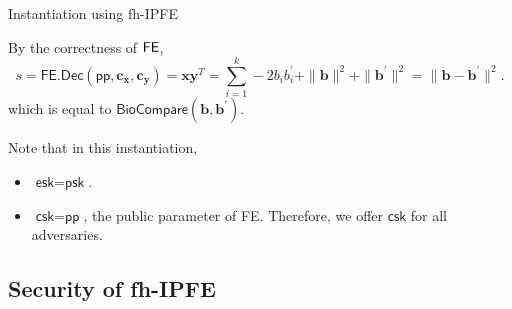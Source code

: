 \begin{frame}{Instantiation using fh-IPFE \cite{cryptoeprint:2023/481}}

By the correctness of $\sf FE$,
\[
	s = \textsf{FE.Dec}(\textsf{pp}, \mathbf{c_x}, \mathbf{c_y}) =  \mathbf{x} \mathbf{y}^T = \sum_{i=1}^k -2b_ib_i^\prime + \|\mathbf{b}\|^2 + \|\mathbf{b}^\prime\|^2 = \| \mathbf{b} - \mathbf{b}^\prime \|^2.
\]
which is equal to $\textsf{BioCompare}(\mathbf{b}, \mathbf{b}^\prime)$.
\pause
\medskip

Note that in this instantiation,
\pause

\begin{itemize}
	\item $\textsf{esk} = \textsf{psk}$.
	\pause

	\item $\textsf{csk} = \textsf{pp}$, the public parameter of \textsf{FE}. Therefore, we offer $\textsf{csk}$ for all adversaries.

\end{itemize}


\end{frame}


\subsection{Security of fh-IPFE}


